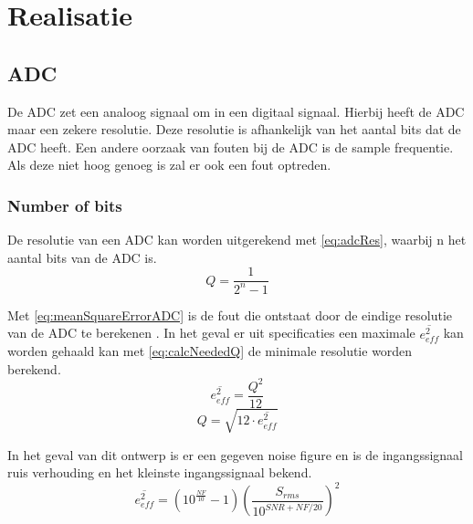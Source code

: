\section{Realisatie}




\subsection{ADC}

De ADC zet een analoog signaal om in een digitaal signaal. Hierbij heeft de ADC maar een zekere resolutie. Deze resolutie is afhankelijk van het aantal bits dat de ADC heeft. Een andere oorzaak van fouten bij de ADC is de sample frequentie. Als deze niet hoog genoeg is zal er ook een fout optreden.

\subsubsection{Number of bits} \label{sec:ADC:numBits}
De resolutie van een ADC kan worden uitgerekend met \autoref{eq:adcRes}, waarbij n het aantal bits van de ADC is.
\begin{equation}\label{eq:adcRes}
    Q=\frac{1}{2^n-1}
\end{equation}

Met \autoref{eq:meanSquareErrorADC} is de fout die ontstaat door de eindige resolutie van de ADC te berekenen \cite{MJHcalcADC}. In het geval er uit specificaties een maximale $\overline{e_{eff}^2}$ kan worden gehaald kan met \autoref{eq:calcNeededQ} de minimale resolutie worden berekend.
\begin{equation}\label{eq:meanSquareErrorADC} 
    \overline{e_{eff}^2}=\frac{Q^2}{12}
\end{equation}
\begin{equation}\label{eq:calcNeededQ}
    Q=\sqrt{12\cdot\overline{e_{eff}^2}}
\end{equation}

In het geval van dit ontwerp is er een gegeven noise figure en is de ingangssignaal ruis verhouding en het kleinste ingangssignaal bekend. %
\begin{equation}\label{eq:calcSpecifiedRmsError}
    \overline{e_{eff}^2}=\left(10^{\frac{NF}{10}}-1\right)\left(\frac{S_{rms}}{10^{SNR+NF/20}}\right)^2
\end{equation}

